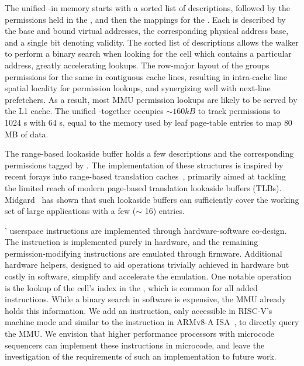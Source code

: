 The unified \ptable-\gtable in memory starts with a sorted
list of \cell descriptions, followed by the permissions held in the 
\ptable, and then the mappings for the \gtable.
Each \cell is described by the base and bound virtual addresses, 
the corresponding physical address base, and a single bit denoting
validity.
The sorted list of \cell{} descriptions allows the \ptable walker to
perform a binary search when looking for the cell which contains a particular
address, greatly accelerating lookups.
The row-major layout of the \ptable groups permissions for the same \secdiv
in contiguous cache lines, resulting in intra-cache line spatial locality for
permission lookups, and synergizing well with next-line prefetchers.
As a result, most MMU permission lookups are likely to be served by the L1 cache.
The unified \ptable-\gtable together occupies $\sim160kB$ to track permissions
to 1024 \cell{}s with 64 \secdiv{}s, equal to the memory used by leaf 
page-table entries to map $80$MB of data.

The range-based lookaside buffer holds a few \cell{} descriptions
and the corresponding permissions tagged by \sid.
The implementation of these structures is inspired by recent forays into 
range-based translation caches~\cite{0003BOBFP21midgard, YanLNB19, BasuGCHS13}, 
primarily aimed at tackling the limited reach of modern page-based translation 
lookaside buffers (TLBs).
Midgard~\cite{0003BOBFP21midgard} has shown that such lookaside buffers can 
sufficiently cover the working set of large applications with a 
few ($\sim$ 16) entries.

\seccells' userspace instructions are implemented through 
hardware-software co-design.
The \sdswitch instruction is implemented purely in hardware, and the
remaining permission-modifying instructions are emulated through firmware.
Additional hardware helpers, designed to aid operations trivially achieved
in hardware but costly in software, simplify and accelerate the emulation.
One notable operation is the lookup of the cell's index in the 
\ptable, which is common for all added instructions.
While a binary search in software is expensive, the MMU already holds this
information. 
We add an instruction, only accessible in RISC-V's machine mode and similar 
to the  instruction in ARMv8-A ISA~\cite{ARMAT}, to directly query the MMU.
We envision that higher performance processors with microcode sequencers
can implement these instructions in microcode, and
leave the investigation of the requirements of such an implementation
to future work.

